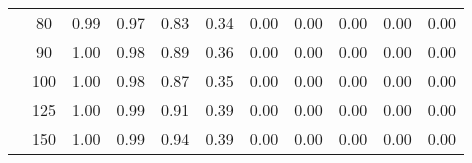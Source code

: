 \begin{table}[t]
\begin{center}
\begin{subtable}[c]{\textwidth}
\begin{center}
\begin{tabular}{rcccccccccc}
                                            & \multicolumn{1}{c|}{80}  & \num{0.99}  & \num{0.97}  & \num{0.83}  & \num{0.34}  & \num{0.00}  & \num{0.00}  & \num{0.00}  & \num{0.00}  & \num{0.00}  \\
                                            & \multicolumn{1}{c|}{90}  & \num{1.00}  & \num{0.98}  & \num{0.89}  & \num{0.36}  & \num{0.00}  & \num{0.00}  & \num{0.00}  & \num{0.00}  & \num{0.00}  \\
                                            & \multicolumn{1}{c|}{100}  & \num{1.00}  & \num{0.98}  & \num{0.87}  & \num{0.35}  & \num{0.00}  & \num{0.00}  & \num{0.00}  & \num{0.00}  & \num{0.00}  \\
                                            & \multicolumn{1}{c|}{125}  & \num{1.00}  & \num{0.99}  & \num{0.91}  & \num{0.39}  & \num{0.00}  & \num{0.00}  & \num{0.00}  & \num{0.00}  & \num{0.00}  \\
                                            & \multicolumn{1}{c|}{150}  & \num{1.00}  & \num{0.99}  & \num{0.94}  & \num{0.39}  & \num{0.00}  & \num{0.00}  & \num{0.00}  & \num{0.00}  & \num{0.00}  \\
                                    \end{tabular}
            \end{center}
        \end{subtable}

        \vspace{5mm}


\end{center}
\end{table}
